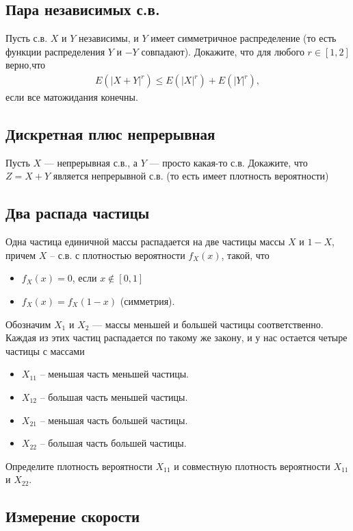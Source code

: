 \documentclass[12pt]{article}
\begin{document}
\subsection{Пара независимых с.в.}

Пусть с.в. $X$ и $Y$ независимы, и $Y$ имеет симметричное распределение (то есть функции распределения $Y$ и $-Y$ совпадают). Докажите, что для любого $r \in [1, 2]$ верно,что 
\begin{align*}
    E(|X + Y|^r) \le E(|X|^r) + E(|Y|^r),
\end{align*}
если все матожидания конечны.


\setcounter{subsection}{5}
\subsection{Дискретная плюс непрерывная}

Пусть $X$ --- непрерывная с.в., а $Y$ --- просто какая-то с.в. Докажите, что $Z = X + Y$ является непрерывной с.в. (то есть имеет плотность вероятности)

\subsection{Два распада частицы}

Одна частица единичной массы распадается на две частицы массы $X$ и $1 - X$, причем $X$ -- с.в. с плотностью вероятности $f_X(x)$, такой, что
\begin{itemize}
    \item $f_X(x) = 0$, если $x \notin [0, 1]$
    \item $f_X(x) = f_X(1 - x)$ (симметрия).
\end{itemize}
Обозначим $X_1$ и $X_2$ --- массы меньшей и большей частицы соответственно. Каждая из этих частиц распадается по такому же закону, и у нас остается четыре частицы с массами
\begin{itemize}
    \item $X_{11}$ -- меньшая часть меньшей частицы.
    \item $X_{12}$ -- большая часть меньшей частицы.
    \item $X_{21}$ -- меньшая часть большей частицы.
    \item $X_{22}$ -- большая часть большей частицы.
\end{itemize}
Определите плотность вероятности $X_{11}$ и совместную плотность вероятности $X_{11}$ и $X_{22}$.

\subsection{Измерение скорости}
\end{document}
